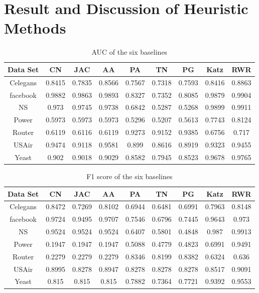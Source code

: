 \documentclass[12pt]{article}
\begin{document}
\section{Result and Discussion of Heuristic Methods}
\begin{table}
	\begin{center}
		\begin{tabular}{|c|c|c|c|c|c|c|c|c|}
			\hline
			Data Set & CN & JAC & AA & PA  & TN & PG & Katz & RWR\\
			\hline
			Celegans&0.8415&0.7835&0.8566&0.7567&0.7318&0.7593&0.8416&0.8863\\
			facebook&0.9882&0.9863&0.9893&0.8327&0.7352&0.8085&0.9879&0.9904\\
			NS&0.973&0.9745&0.9738&0.6842&0.5287&0.5268&0.9899&0.9911\\
			Power&0.5973&0.5973&0.5973&0.5296&0.5207&0.5613&0.7743&0.8124\\
			Router&0.6119&0.6116&0.6119&0.9273&0.9152&0.9385&0.6756&0.717\\
			USAir&0.9474&0.9118&0.9581&0.899&0.8616&0.8919&0.9323&0.9455\\
			Yeast&0.902&0.9018&0.9029&0.8582&0.7945&0.8523&0.9678&0.9765\\
			\hline
		\end{tabular}
	\end{center}
	\caption{AUC of the six baselines}
	\label{tab:auc}
\end{table}

\begin{table}
	\begin{center}
		\begin{tabular}{|c|c|c|c|c|c|c|c|c|}
			\hline
			Data Set & CN & JAC & AA & PA & TN & PG & Katz & RWR \\
			\hline
			Celegans&0.8472&0.7269&0.8102&0.6944&0.6481&0.6991&0.7963&0.8148\\
			facebook&0.9724&0.9495&0.9707&0.7546&0.6796&0.7445&0.9643&0.973\\
			NS&0.9524&0.9524&0.9524&0.6407&0.5801&0.4848&0.987&0.9913\\
			Power&0.1947&0.1947&0.1947&0.5088&0.4779&0.4823&0.6991&0.9491\\
			Router&0.2279&0.2279&0.2279&0.8346&0.8199&0.8382&0.6324&0.636\\
			USAir&0.8995&0.8278&0.8947&0.8278&0.8278&0.8278&0.8517&0.9091\\
			Yeast&0.815&0.815&0.815&0.7882&0.7364&0.7721&0.9392&0.9553\\
			\hline
		\end{tabular}
	\end{center}
	\caption{F1 score of the six baselines}
	\label{tab:f1}
\end{table}
\end{document}
